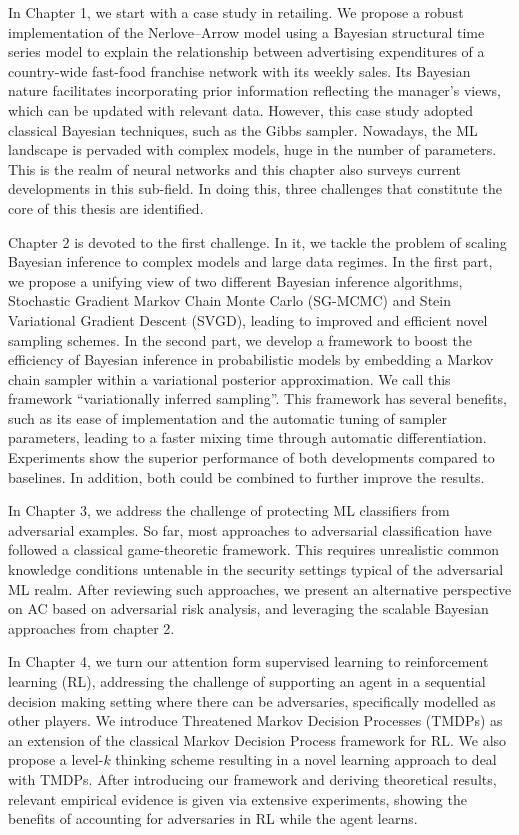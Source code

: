 \documentclass[a4paper, 11pt, openright, twoside]{reportPhD}
\numberwithin{figure}{chapter}
\numberwithin{table}{chapter}
\numberwithin{equation}{chapter}
\begin{document}
In Chapter 1, we start with a case study in retailing. We propose a robust implementation of the Nerlove–Arrow model using a Bayesian structural time series model to explain the relationship between advertising expenditures
of a country-wide fast-food franchise network with its weekly sales. Its Bayesian nature facilitates incorporating prior information reflecting the manager’s views, which can be updated with relevant data. However, this case study adopted classical Bayesian techniques, such as the Gibbs sampler. Nowadays, the ML landscape is pervaded with complex models, huge in the number of parameters. This is the realm of neural networks and this chapter also surveys current developments in this sub-field. In doing this, three challenges that constitute the core of this thesis are identified.

Chapter 2 is devoted to the first challenge. In it, we tackle the problem of scaling Bayesian inference to complex models and large data regimes. In the first part, we propose a unifying view of two different Bayesian inference algorithms, Stochastic Gradient Markov Chain Monte Carlo (SG-MCMC) and Stein Variational Gradient Descent (SVGD), leading to improved and efficient novel sampling schemes. In the second part, we develop a framework to boost the efficiency of Bayesian inference in probabilistic models by embedding a Markov chain sampler within a variational posterior approximation. We call this framework “variationally inferred sampling”. This framework has several benefits, such as its ease of implementation and the automatic tuning of sampler parameters, leading to a faster mixing time through automatic differentiation. Experiments show the superior performance of both developments compared to baselines. In addition, both could be combined to further improve the results.

In Chapter 3, we address the challenge of protecting ML classifiers from adversarial examples. So far, most approaches to adversarial classification have followed a classical game-theoretic framework. This requires unrealistic common knowledge conditions untenable in the security settings typical of the adversarial ML realm. After reviewing such approaches, we present an alternative perspective on AC based on adversarial risk analysis, and leveraging the scalable Bayesian approaches from chapter 2.

In Chapter 4, we turn our attention form supervised learning to reinforcement learning (RL), addressing the challenge of supporting an agent in a sequential decision making setting where there can be adversaries, specifically modelled as other players. We introduce Threatened Markov Decision Processes (TMDPs) as an extension of the classical Markov Decision Process framework for RL. We also propose a level-$k$ thinking scheme resulting in a novel learning approach to deal with TMDPs. After introducing our framework and deriving theoretical results, relevant empirical evidence is given via extensive experiments, showing the benefits of accounting for adversaries in RL while the agent learns.
\end{document}
